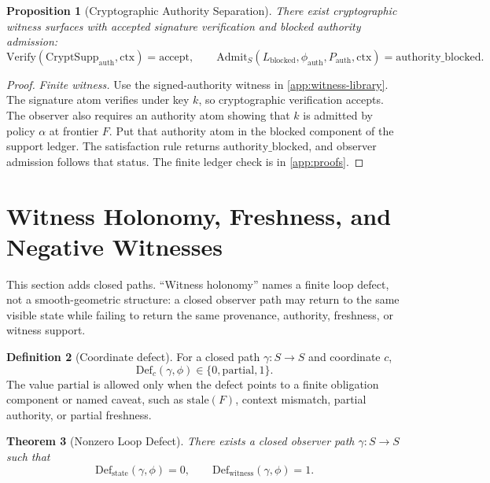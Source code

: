 \documentclass[11pt,twoside]{article}
\newtheorem{theorem}{Theorem}[section]
\newtheorem{proposition}[theorem]{Proposition}
\theoremstyle{definition}
\newtheorem{definition}[theorem]{Definition}
\newcommand{\CryptSupp}{\mathrm{CryptSupp}}
\newcommand{\Admit}{\mathrm{Admit}}
\newcommand{\Def}{\mathrm{Def}}
\newcommand{\Verify}{\mathrm{Verify}}
\newcommand{\ctx}{\mathrm{ctx}}
\newcommand{\stale}{\mathrm{stale}}
\newcommand{\authorityblocked}{\mathrm{authority\_blocked}}
\begin{document}
\begin{proposition}[Cryptographic Authority Separation]
\label{prop:cryptographic-authority-separation}
There exist cryptographic witness surfaces with accepted signature verification
and blocked authority admission:
\[
  \Verify(\CryptSupp_{\mathrm{auth}},\ctx)=\mathrm{accept},
  \qquad
  \Admit_S(L_{\mathrm{blocked}},\phi_{\mathrm{auth}},P_{\mathrm{auth}},\ctx)
  =
  \authorityblocked.
\]
\end{proposition}

\begin{proof}
\textit{Finite witness.}
Use the signed-authority witness in \cref{app:witness-library}. The signature
atom verifies under key $k$, so cryptographic verification accepts. The observer
also requires an authority atom showing that $k$ is admitted by policy
$\alpha$ at frontier $F$. Put that authority atom in the blocked component of
the support ledger. The satisfaction rule returns $\authorityblocked$, and
observer admission follows that status. The finite ledger check is in
\cref{app:proofs}.
\end{proof}

\section{Witness Holonomy, Freshness, and Negative Witnesses}
\label{sec:holonomy}

This section adds closed paths. \enquote{Witness holonomy} names a finite loop
defect, not a smooth-geometric structure: a closed observer path may return to
the same visible state while failing to return the same provenance, authority,
freshness, or witness support.

\begin{definition}[Coordinate defect]
\label{def:coordinate-defect}
For a closed path $\gamma:S\to S$ and coordinate $c$,
\[
  \Def_c(\gamma,\phi)\in\{0,\mathrm{partial},1\}.
\]
The value $\mathrm{partial}$ is allowed only when the defect points to a finite
obligation component or named caveat, such as $\stale(F)$, context mismatch,
partial authority, or partial freshness.
\end{definition}

\begin{theorem}[Nonzero Loop Defect]
\label{thm:nonzero-witness-holonomy}
There exists a closed observer path $\gamma:S\to S$ such that
\[
  \Def_{\mathrm{state}}(\gamma,\phi)=0,\qquad
  \Def_{\mathrm{witness}}(\gamma,\phi)=1.
\]
\end{theorem}
\end{document}
